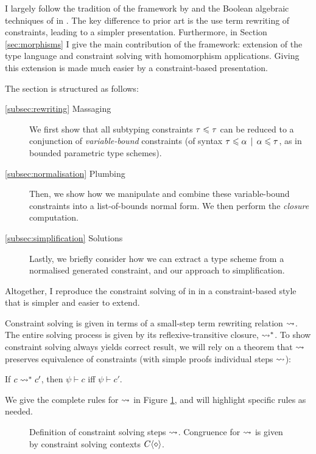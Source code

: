 I largely follow the tradition of the framework by \textcite{pottier-framework} and the Boolean algebraic techniques of \textcite{mlstruct} in \mlstruct{}. The key difference to prior art is the use term rewriting of constraints, leading to a simpler presentation. Furthermore, in Section \ref{sec:morphisms} I give the main contribution of the framework: extension of the type language and constraint solving with homomorphism applications. Giving this extension is made much easier by a constraint-based presentation.

The section is structured as follows: \begin{description}
    \item[\ref{subsec:rewriting} Massaging] We first show that all subtyping constraints $\tau \leqslant \tau$ can be reduced to a conjunction of \emph{variable-bound} constraints (of syntax $\tau \leqslant \alpha \,\mid\, \alpha \leqslant \tau$, as in bounded parametric type schemes).
    \item[\ref{subsec:normalisation} Plumbing] Then, we show how we manipulate and combine these variable-bound constraints into a list-of-bounds normal form. We then perform the \emph{closure} computation.
    \item[\ref{subsec:simplification} Solutions] Lastly, we briefly consider how we can extract a type scheme from a normalised generated constraint, and our approach to simplification.
\end{description} 
Altogether, I reproduce the constraint solving of \textcite{mlstruct} in \mlstruct{} in a constraint-based style that is simpler and easier to extend. 

Constraint solving is given in terms of a small-step term rewriting relation $\leadsto$. The entire solving process is given by its reflexive-transitive closure, $\leadsto^*$.
To show constraint solving always yields correct result, we will rely on a theorem that $\leadsto$ preserves equivalence of constraints (with simple proofs individual steps $\leadsto$):
\begin{theorem}
    If $c \leadsto^* c'$, then $\psi \vdash c$ iff $\psi \vdash c'$.
\end{theorem}
We give the complete rules for $\leadsto$ in Figure \ref{fig:solver}, and will highlight specific rules as needed.

\begin{figure}
    \centering
    
    \caption{Definition of constraint solving steps $\leadsto$. Congruence for $\leadsto$ is given by constraint solving contexts $\solvectx$.}
    \label{fig:solver}
\end{figure}

